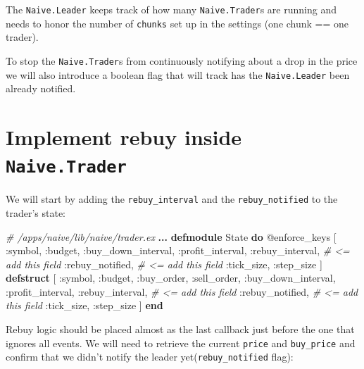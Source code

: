 \documentclass[
  oneside]{book}
\newenvironment{Shaded}{\begin{snugshade}}{\end{snugshade}}
\newcommand{\CommentTok}[1]{\textcolor[rgb]{0.56,0.35,0.01}{\textit{#1}}}
\newcommand{\ConstantTok}[1]{\textcolor[rgb]{0.56,0.35,0.01}{#1}}
\newcommand{\KeywordTok}[1]{\textcolor[rgb]{0.13,0.29,0.53}{\textbf{#1}}}
\newcommand{\NormalTok}[1]{#1}
\newcommand{\OperatorTok}[1]{\textcolor[rgb]{0.81,0.36,0.00}{\textbf{#1}}}
\newcommand{\OtherTok}[1]{\textcolor[rgb]{0.56,0.35,0.01}{#1}}
\newcommand{\VariableTok}[1]{\textcolor[rgb]{0.00,0.00,0.00}{#1}}
\begin{document}
The \texttt{Naive.Leader} keeps track of how many \texttt{Naive.Trader}s are running and needs to honor the number of \texttt{chunks} set up in the settings (one chunk == one trader).

To stop the \texttt{Naive.Trader}s from continuously notifying about a drop in the price we will also introduce a boolean flag that will track has the \texttt{Naive.Leader} been already notified.

\section{\texorpdfstring{Implement rebuy inside \texttt{Naive.Trader}}{Implement rebuy inside Naive.Trader}}\label{implement-rebuy-inside-naive.trader}

We will start by adding the \texttt{rebuy\_interval} and the \texttt{rebuy\_notified} to the trader's state:

\begin{Shaded}
\begin{Highlighting}[]
  \CommentTok{\# /apps/naive/lib/naive/trader.ex}
  \OperatorTok{...}
  \KeywordTok{defmodule} \ConstantTok{State} \KeywordTok{do}
    \OtherTok{@enforce\_keys} \OtherTok{[}
      \VariableTok{:symbol}\NormalTok{,}
      \VariableTok{:budget}\NormalTok{,}
      \VariableTok{:buy\_down\_interval}\NormalTok{,}
      \VariableTok{:profit\_interval}\NormalTok{,}
      \VariableTok{:rebuy\_interval}\NormalTok{, }\CommentTok{\# \textless{}= add this field}
      \VariableTok{:rebuy\_notified}\NormalTok{, }\CommentTok{\# \textless{}= add this field}
      \VariableTok{:tick\_size}\NormalTok{,}
      \VariableTok{:step\_size}
    \OtherTok{]}
    \KeywordTok{defstruct} \OtherTok{[}
      \VariableTok{:symbol}\NormalTok{,}
      \VariableTok{:budget}\NormalTok{,}
      \VariableTok{:buy\_order}\NormalTok{,}
      \VariableTok{:sell\_order}\NormalTok{,}
      \VariableTok{:buy\_down\_interval}\NormalTok{,}
      \VariableTok{:profit\_interval}\NormalTok{,}
      \VariableTok{:rebuy\_interval}\NormalTok{, }\CommentTok{\# \textless{}= add this field}
      \VariableTok{:rebuy\_notified}\NormalTok{, }\CommentTok{\# \textless{}= add this field}
      \VariableTok{:tick\_size}\NormalTok{,}
      \VariableTok{:step\_size}
    \OtherTok{]}
  \KeywordTok{end}
\end{Highlighting}
\end{Shaded}

Rebuy logic should be placed almost as the last callback just before the one that ignores all events. We will need to retrieve the current \texttt{price} and \texttt{buy\_price} and confirm that we didn't notify the leader yet(\texttt{rebuy\_notified} flag):
\end{document}
